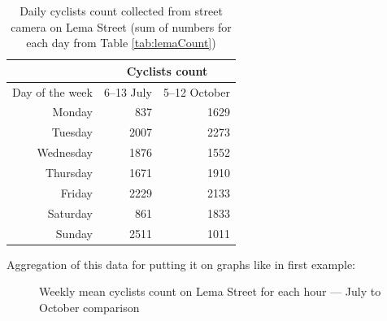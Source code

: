 \begin{table}[H]
    \centering
    \begin{tabular}{|r|r|r|}
\hline
\multicolumn{1}{|l|}{}                & \multicolumn{2}{c|}{Cyclists count}                                \\ \hline
\multicolumn{1}{|l|}{Day of the week} & \multicolumn{1}{l|}{6--13 July} & \multicolumn{1}{l|}{5--12 October} \\ \hline
Monday                                     & 837                            & 1629                              \\ \hline
Tuesday                                     & 2007                           & 2273                              \\ \hline
Wednesday                                     & 1876                           & 1552                              \\ \hline
Thursday                                     & 1671                           & 1910                              \\ \hline
Friday                                     & 2229                           & 2133                              \\ \hline
Saturday                                     & 861                            & 1833                              \\ \hline
Sunday                                     & 2511                           & 1011                              \\ \hline
\end{tabular}
    \caption{Daily cyclists count collected from street camera on Lema Street (sum of numbers for each day from Table \ref{tab:lemaCount})}
    \label{tab:lemaSum}
\end{table}
Aggregation of this data for putting it on graphs like in first example:
\begin{figure}[H]
    \centering
    \caption{Weekly mean cyclists count on Lema Street for each hour --- July to October comparison}
    \label{fig:lemaCount}
\end{figure}
